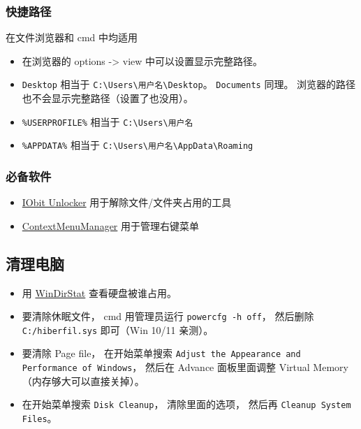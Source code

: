 \subsubsection{快捷路径}
在文件浏览器和 cmd 中均适用
\begin{itemize}
\item 在浏览器的 options -> view 中可以设置显示完整路径。
\item \verb|Desktop| 相当于 \verb|C:\Users\用户名\Desktop|。 \verb|Documents| 同理。 浏览器的路径也不会显示完整路径（设置了也没用）。
\item \verb|%USERPROFILE%| 相当于 \verb|C:\Users\用户名|
\item \verb|%APPDATA%| 相当于 \verb|C:\Users\用户名\AppData\Roaming|
\end{itemize}

\subsubsection{必备软件}
\begin{itemize}
\item \href{https://www.iobit.com/en/iobit-unlocker.php}{IObit Unlocker} 用于解除文件/文件夹占用的工具
\item \href{https://github.com/BluePointLilac/ContextMenuManager}{ContextMenuManager} 用于管理右键菜单
\end{itemize}

\subsection{清理电脑}
\begin{itemize}
\item 用 \href{https://windirstat.net/}{WinDirStat} 查看硬盘被谁占用。
\item 要清除休眠文件， cmd 用管理员运行 \verb|powercfg -h off|， 然后删除 \verb|C:/hiberfil.sys| 即可（Win 10/11 亲测）。
\item 要清除 Page file， 在开始菜单搜索 \verb|Adjust the Appearance and Performance of Windows|， 然后在 Advance 面板里面调整 Virtual Memory（内存够大可以直接关掉）。
\item 在开始菜单搜索 \verb|Disk Cleanup|， 清除里面的选项， 然后再 \verb|Cleanup System Files|。
\end{itemize}


